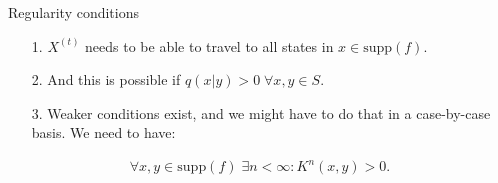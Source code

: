 \documentclass[11pt]{beamer}
\begin{document}
    \begin{frame}{Regularity conditions}
        \begin{itemize}
            \item [1.] $X^{(t)}$ needs to be able to travel to all states in $x\in \text{supp}(f)$. 
            \item [2.] And this is possible if $q(x|y) > 0 \;\forall x, y\in S$. 
            \item [3.] Weaker conditions exist, and we might have to do that in a case-by-case basis. We need to have: 
        \end{itemize}
        \begin{align*}
           \forall x,y \in \text{supp}(f) \;\exists n < \infty: K^n(x, y) > 0. 
        \end{align*}
    \end{frame}
\end{document}
